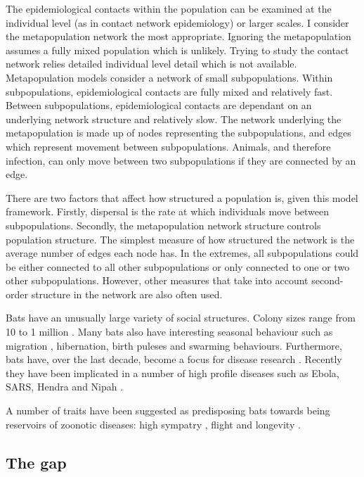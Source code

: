 The epidemiological contacts within the population can be examined at the individual level (as in contact network epidemiology) or larger scales.
I consider the metapopulation network the most appropriate.
Ignoring the metapopulation assumes a fully mixed population which is unlikely.
Trying to study the contact network relies detailed individual level detail which is not available.
Metapopulation models consider a network of small subpopulations. 
Within subpopulations, epidemiological contacts are fully mixed and relatively fast.
Between subpopulations, epidemiological contacts are dependant on an underlying network structure and relatively slow.
The network underlying the metapopulation is made up of nodes representing the subpopulations, and edges which represent movement between subpopulations.
Animals, and therefore infection, can only move between two subpopulations if they are connected by an edge.

There are two factors that affect how structured a population is, given this model framework.
Firstly, dispersal is the rate at which individuals move between subpopulations.
Secondly, the metapopulation network structure controls population structure.
The simplest measure of how structured the network is the average number of edges each node has.
In the extremes, all subpopulations could be either connected to all other subpopulations or only connected to one or two other subpopulations.
However, other measures that take into account second-order structure in the network are also often used.




Bats have an unusually large variety of social structures.
Colony sizes range from 10 to 1 million \cite{jones2009pantheria}.
Many bats also have interesting seasonal behaviour such as migration \cite{richter2008first, fleming2003ecology}, hibernation, birth puleses and swarming behaviours.
Furthermore, bats have, over the last decade, become a focus for disease research  \cite{calisher2006bats, hughes2007emerging}.
Recently they have been implicated in a number of high profile diseases such as Ebola, SARS, Hendra and Nipah  \cite{calisher2006bats, li2005bats}.

A number of traits have been suggested as predisposing bats towards being reservoirs of zoonotic diseases: high sympatry \cite{luis2013comparison}, flight \cite{wang2011mass} and longevity \cite{wang2011mass}.




\subsection{The gap}

